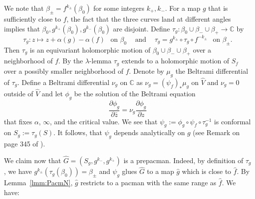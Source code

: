 \documentclass[]{amsart}
\renewcommand{\sp}{{\ \ }}
\newcommand{\C}{\mathbb{C}}
\theoremstyle{remark}
\numberwithin{equation}{section}
\theoremstyle{definition}
\begin{document}
We note that $\beta_\pm =f^{k_\pm}(\beta_0)$ for some integers $k_+,k_-$. For a map $g$ that is sufficiently close to $f$, the fact that the three curves land at different angles implies that $\beta_0, g^{k_+}(\beta_0), g^{k_-}(\beta_0)$ are disjoint. Define $\tau_g \colon \beta_0\cup \beta_- \cup  \beta_+   \to \C$ by \[\tau_g\colon z\mapsto z+\alpha(g)-\alpha(f)\sp \text{ on $\beta_0$}\sp\sp\text{ and }\sp  \sp \tau_g=g^{k_\pm}\circ \tau_g\circ  f^{-k_\pm}  \sp \text{ on $\beta_\pm$}.\] Then $\tau_g$ is an equivariant holomorphic motion of $\beta_0\cup \beta_- \cup  \beta_+ $ over a neighborhood of $f$. By the $\lambda$-lemma \cites{BR,ST} $\tau_g$ extends to a holomorphic motion of $S_f$  over a possibly smaller neighborhood of $f$. Denote by $\mu_g$ the Beltrami differential of $\tau_g$. Define a Beltrami differential $\nu_g$ on $\C$ as $\nu_g=(\psi_f)_* \mu_g$ on $\widehat{V}$ and $\nu_g=0$ outside of $\widehat V$ and let $\phi_g$ be the solution of the Beltrami equation \[ \frac{\partial\phi_g}{\partial \bar z}=\nu_g \frac{\partial\phi_g}{\partial   z}\] that fixes $\alpha$, $\infty$, and the critical value. We see that $\psi_g := \phi_g \circ \psi_f \circ \tau_g^{-1}$ is conformal on $  S_g:=\tau_g( {S})$. It follows, that $\psi_g$ depends analytically on $g$ (see Remark on page 345 of \cite{L:FCT}).

We claim now that $\widehat G = (S_g, g^{k_-}, g^{k_+})$ is a prepacman. Indeed, by definition of $\tau_g$, we have $g^{k_\pm}(\tau_g(\beta_0))=\beta_\pm$ and  $\psi_g$  glues $\widehat G$ to a map $\hat g$ which is close to $\hat f$. By Lemma~\ref{lmm:PacmN}, $\hat g$ restricts to a pacman with the same range as $\hat f$. We have:
\end{document}
